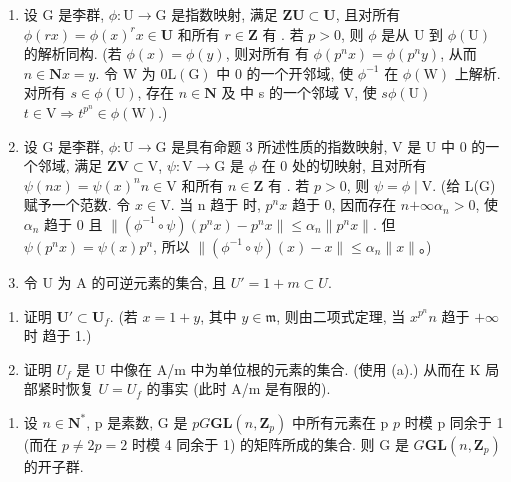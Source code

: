 
\begin{enumerate}
\def\labelenumi{\arabic{enumi}.}
\item
  设 \(\mathrm{G}\) 是李群, \(\phi: \mathrm{U} \to \mathrm{G}\) 是指数映射, 满足 \(\mathbf{Z}\mathbf{U} \subset \mathbf{U}\), 且对所有 \(\phi(rx) = \phi(x)^r\)\(x \in \mathbf{U}\) 和所有 \(r \in \mathbf{Z}\) 有 . 若 \(p > 0\), 则 \(\phi\) 是从 \(\mathrm{U}\) 到 \(\phi(\mathrm{U})\) 的解析同构. (若 \(\phi(x) = \phi(y)\), 则对所有  有 \(\phi(p^n x) = \phi(p^n y)\), 从而 \(n \in \mathbf{N}\)\(x = y\). 令 \(\mathrm{W}\) 为 \(0\)\(\mathrm{L}(\mathrm{G})\) 中 0 的一个开邻域, 使 \(\phi^{-1}\) 在 \(\phi(\mathrm{W})\) 上解析. 对所有 \(s \in \phi(\mathrm{U})\), 存在 \(n \in \mathbf{N}\) 及  中 s 的一个邻域 \(\mathrm{V}\), 使 \(s\)\(\phi(\mathrm{U})\)\(t \in \mathrm{V} \Rightarrow t^{p^n} \in \phi(\mathrm{W})\).)
\item
  设 G 是李群, \(\phi: \mathrm{U} \to \mathrm{G}\) 是具有命题 3 所述性质的指数映射, V 是 U 中 0 的一个邻域, 满足 \(\mathbf{ZV} \subset \mathrm{V}\), \(\psi: \mathrm{V} \to \mathrm{G}\) 是 \(\phi\) 在 0 处的切映射, 且对所有 \(\psi(nx) = \psi(x)^n\)\(n \in \mathrm{V}\) 和所有 \(n \in \mathbf{Z}\) 有 . 若 \(p > 0\), 则 \(\psi = \phi \mid \mathrm{V}\). (给 L(G) 赋予一个范数. 令 \(x \in \mathrm{V}\). 当 n 趋于  时, \(p^n x\) 趋于 0, 因而存在 \(n\)\(+\infty\)\(\alpha_n > 0\), 使 \(\alpha_n\) 趋于 0 且 \(\|(\phi^{-1} \circ \psi)(p^n x) - p^n x \| \leqslant \alpha_n \|p^n x\|\). 但 \(\psi(p^n x) = \psi(x)p^n\), 所以 \(\|(\phi^{-1} \circ \psi)(x) - x \| \leqslant \alpha_n \|x\|\)。)
\item
  令 U 为 A 的可逆元素的集合, 且 \(U' = 1 + m \subset U\).
\end{enumerate}

\begin{enumerate}
\def\labelenumi{(\alph{enumi})}
\item
  证明 \(\mathbf{U}' \subset \mathbf{U}_f\). (若 \(x = 1 + y\), 其中 \(y \in \mathfrak{m}\), 则由二项式定理, 当 \(x^{p^n}\)\(n\) 趋于 \(+\infty\) 时  趋于 1.)
\item
  证明 \(U_{f}\) 是 U 中像在 A/m 中为单位根的元素的集合. (使用 (a).) 从而在 K 局部紧时恢复 \(U = U_{f}\) 的事实 (此时 A/m 是有限的).
\end{enumerate}

\begin{enumerate}
\def\labelenumi{\arabic{enumi}.}
\setcounter{enumi}{3}
\tightlist
\item
  设 \(n \in \mathbf{N}^*\), p 是素数, G 是 \(p\)\(G\)\(\mathbf{GL}(n, \mathbf{Z}_p)\) 中所有元素在 p \(p\) 时模 p 同余于 1 (而在 \(p \neq 2\)\(p = 2\) 时模 4 同余于 1) 的矩阵所成的集合. 则 G 是 \(G\)\(\mathbf{GL}(n, \mathbf{Z}_p)\) 的开子群.
\end{enumerate}

